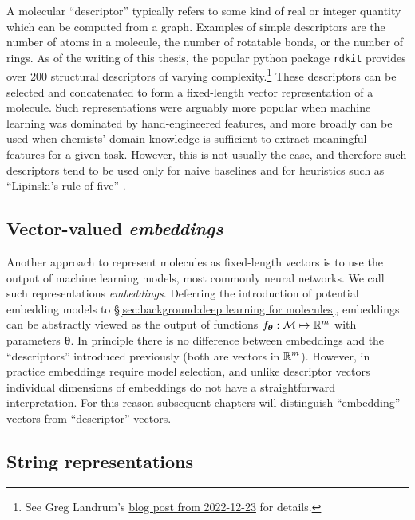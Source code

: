 A molecular ``descriptor'' typically refers to some kind of real or integer quantity which can be computed from a graph.
Examples of simple descriptors are the number of atoms in a molecule,
the number of rotatable bonds, or the number of rings.
As of the writing of this thesis, the popular python package \texttt{rdkit}
provides over 200 structural descriptors of varying complexity.\footnote{
    See Greg Landrum's \href{https://greglandrum.github.io/rdkit-blog/posts/2022-12-23-descriptor-tutorial.html}{blog post from 2022-12-23}
    for details.
}
These descriptors can be selected and concatenated to form a fixed-length
vector representation of a molecule. 
Such representations were arguably more popular when machine learning was dominated by hand-engineered features,
and more broadly can be used when chemists' domain knowledge is sufficient to extract meaningful features for a given task.
However, this is not usually the case, and therefore such descriptors tend to be used only for naive baselines
and for heuristics such as ``Lipinski's rule of five'' \citep{lipinski2001experimental}.

\subsection{Vector-valued \emph{embeddings}}

Another approach to represent molecules as fixed-length vectors is to use the output of
machine learning models, most commonly neural networks.
We call such representations \emph{embeddings}.
Deferring the introduction of potential embedding models to \S\ref{sec:background:deep learning for molecules},
embeddings can be abstractly viewed as the output of functions $f_{\bm{\theta}}:\mathcal{M}\mapsto\mathbb{R}^m$
with parameters $\bm{\theta}$.
In principle there is no difference between embeddings and the ``descriptors''
introduced previously (both are vectors in $\mathbb{R}^m$).
However, in practice embeddings require model selection,
and unlike descriptor vectors individual dimensions of embeddings do not have a straightforward interpretation.
For this reason subsequent chapters will distinguish ``embedding'' vectors from ``descriptor'' vectors.

\subsection{String representations}
\label{sec:background:string-reps}

